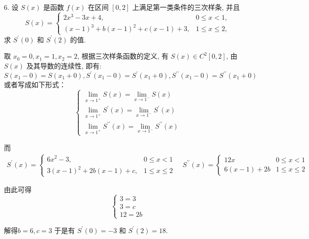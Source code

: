 \begin{tcolorbox}[breakable,enhanced,arc=0mm,outer arc=0mm,
		boxrule=0pt,toprule=1pt,leftrule=0pt,bottomrule=1pt, rightrule=0pt,left=0.2cm,right=0.2cm,
		titlerule=0.5em,toptitle=0.1cm,bottomtitle=-0.1cm,top=0.2cm,
		colframe=white!10!biru,colback=white!90!biru,coltitle=white,
            coltext=black,title =2024-03-10, title style={white!10!biru}, before skip=8pt, after skip=8pt,before upper=\hspace{2em},
		fonttitle=\bfseries,fontupper=\normalsize]
  
6. 设 $ S(x) $ 是函数 $ f(x) $ 在区间 $ [0,2] $ 上满足第一类条件的三次样条, 并且
$$
S(x)=\left\{\begin{array}{ll}
2 x^{3}-3 x+4, & 0 \leq x<1, \\
(x-1)^{3}+b(x-1)^{2}+c(x-1)+3, & 1 \leq x \leq 2,
\end{array}\right.
$$
求 $ S^{\prime}(0) $ 和 $ S^{\prime}(2) $ 的值.
 \tcblower

取 $ x_{0}=0, x_{1}=1, x_{2}=2 $, 根据三次样条函数的定义, 有 $ S(x) \in C^{2}[0,2] $, 由 $ S(x) $ 及其导数的连续性, 即有: 
$$ S\left(x_{1}-0\right)=S\left(x_{1}+0\right), S^{\prime}\left(x_{1}-0\right)=S^{\prime}\left(x_{1}+0\right), S^{\prime \prime}\left(x_{1}-0\right)=S^{\prime \prime}\left(x_{1}+0\right) $$ 
或者写成如下形式：
$$
\left\{\begin{array}{l}
\lim\limits _{x \rightarrow 1^{+}} S(x)=\lim\limits _{x \rightarrow 1^{-}} S(x) \\
\lim \limits_{x \rightarrow 1^{+}} S^{\prime}(x)=\lim\limits _{x \rightarrow 1^{-}} S^{\prime}(x)\\
\lim \limits_{x \rightarrow 1^{+}} S^{\prime\prime}(x)=\lim\limits _{x \rightarrow 1^{-}} S^{\prime\prime}(x)
\end{array}\right.
$$

而$ \begin{array}{l}S^{\prime}(x)=\left\{\begin{array}{ll}6 x^{2}-3 , &0 \leqslant x<1 \\ 3(x-1)^{2}+2 b(x-1)+c,  &1 \leqslant x \leqslant 2\end{array}\right. \quad S^{\prime \prime}(x)=\left\{\begin{array}{ll}12 x & 0 \leqslant x<1 \\ 6(x-1)+2 b & 1 \leqslant x \leqslant 2\end{array}\right. \end{array} $

由此可得
$$
\left\{\begin{array}{l}
3=3 \\
3=c \\
12=2b
\end{array}\right.
$$

解得$b=6, c=3$
于是有 $ S^{\prime}(0)=-3 $ 和 $ S^{\prime}(2)=18 $.
\end{tcolorbox}


